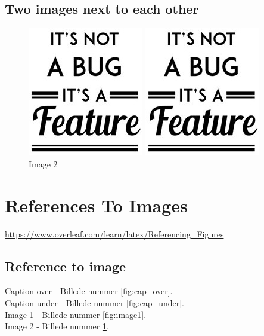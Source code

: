 \documentclass{report}
\begin{document}
    \section{Two images next to each other}
    \begin{figure}[ht]
        \centering
        \begin{minipage}[b]{0.4\textwidth}
            \includegraphics{coverpage/itisnotabugitisafeature.jpg}
            \caption{Image 1}
            \label{fig:image1}
        \end{minipage}
        \hfill
        \begin{minipage}[b]{0.4\textwidth}
            \includegraphics{coverpage/itisnotabugitisafeature.jpg}
            \caption{Image 2}
            \label{fig:image2}
        \end{minipage}
    \end{figure}
    
    \chapter{References To Images}
    \url{https://www.overleaf.com/learn/latex/Referencing_Figures}
    \section{Reference to image}
    Caption over - Billede nummer \ref{fig:cap_over}.\\
    Caption under - Billede nummer \ref{fig:cap_under}.\\
    Image 1 - Billede nummer \ref{fig:image1}.\\
    Image 2 - Billede nummer \ref{fig:image2}.
\end{document}

